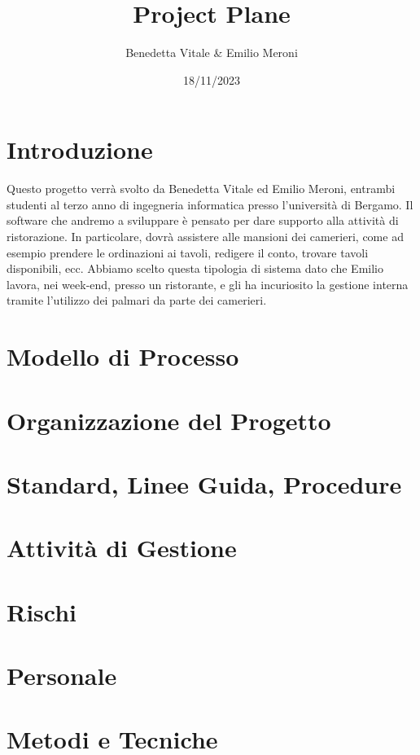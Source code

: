 
\title{Project Plane}
\author{Benedetta Vitale & Emilio Meroni}
\date{18/11/2023}



\chapter{Introduzione}

Questo progetto verrà svolto da Benedetta Vitale ed Emilio Meroni, entrambi studenti al terzo anno di ingegneria informatica presso l'università di Bergamo.
Il software che andremo a sviluppare è pensato per dare supporto alla attività di ristorazione. In particolare, dovrà assistere alle mansioni dei camerieri, come ad esempio prendere le ordinazioni ai tavoli, redigere il conto, trovare tavoli disponibili, ecc.
Abbiamo scelto questa tipologia di sistema dato che Emilio lavora, nei week-end, presso un ristorante, e gli ha incuriosito la gestione interna tramite l'utilizzo dei palmari da parte dei camerieri. 


\chapter{Modello di Processo}


\chapter{Organizzazione del Progetto}

\chapter{Standard, Linee Guida, Procedure}

\chapter{Attività di Gestione}

\chapter{Rischi}

\chapter{Personale}

\chapter{Metodi e Tecniche}


